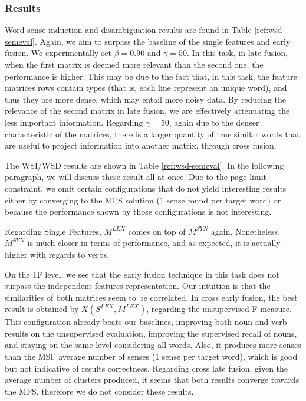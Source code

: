 \documentclass{llncs}
\newcommand\mlex{M^{\scriptscriptstyle LEX}}
\newcommand\msyn{M^{\scriptscriptstyle SYN}}
\newcommand\slex{S^{\scriptscriptstyle LEX}}
\begin{document}
\subsubsection{Results}
Word sense induction and disambiguation results are found in Table \ref{ref:wsd-semeval}. Again, we aim to surpass the baseline of the single features and early fusion.  We experimentally set $\beta=0.90$ and $\gamma=50$. In this task, in late fusion, when the first matrix  is deemed more relevant than the second one, the performance is higher. This may be due to the fact that, in this task, the feature matrices rows contain types (that is, each line represent an unique word), and thus they are more dense, which may entail more noisy data. By reducing the relevance of the second matrix in late fusion, we are effectively attenuating the less important information. Regarding $\gamma=50$, again due to the denser characteristic of the matrices, there is a larger quantity of true similar words that are useful to project information into another matrix, through cross fusion.  

The WSI/WSD results are shown in Table \ref{ref:wsd-semeval}. In the following paragraph, we will discuss these result all at once. Due to the page limit constraint, we omit certain configurations that do not yield interesting results either by converging to the MFS solution (1 sense found per target word) or because the performance shown by those  configurations is not interesting.

Regarding Single Features, $\mlex$ comes on top of $\msyn$ again. Nonetheless, $\msyn$ is much closer in terms of performance, and as expected, it is actually higher with regards to verbs. 

On the 1F level, we see that the early fusion technique in this task does not surpass the independent features representation. Our intuition is that the similarities of both matrices seem to be correlated. In cross early fusion, the best result is obtained by $X(\slex, \mlex)$,  regarding the unsupervised F-measure. This configuration already beats our baselines, improving both noun and verb results on the unsupervised evaluation, improving the supervised recall of nouns, and staying on the same level considering all words. Also, it produces more senses than the MSF average number of senses (1 sense per target word), which is good but not indicative of results correctness. Regarding cross late fusion, given the average number of clusters produced, it seems that both results converge towards the MFS, therefore we do not consider these results.
\end{document}
